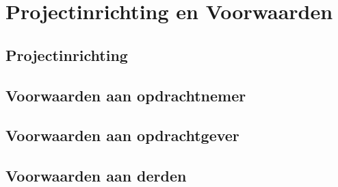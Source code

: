 \section{Projectinrichting en Voorwaarden}
\subsection{Projectinrichting}
\subsection{Voorwaarden aan opdrachtnemer}
\subsection{Voorwaarden aan opdrachtgever}
\subsection{Voorwaarden aan derden}
